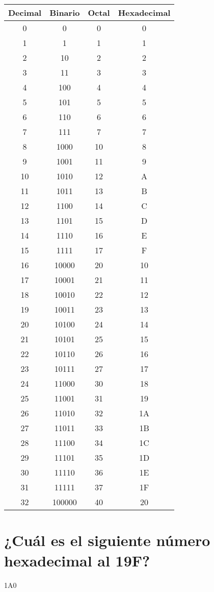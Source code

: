\documentclass{article}
\begin{document}
\section{}
\begin{center}
    \begin{tabular}{ |c|c|c|c| }
        \hline
        Decimal & Binario & Octal & Hexadecimal \\
        \hline
        0 & 0 & 0 & 0 \\
        1 & 1 & 1 & 1 \\
        2 & 10 & 2 & 2 \\
        3 & 11 & 3 & 3 \\
        4 & 100 & 4 & 4 \\
        5 & 101 & 5 & 5 \\
        6 & 110 & 6 & 6 \\
        7 & 111 & 7 & 7 \\
        8 & 1000 & 10 & 8 \\
        9 & 1001 & 11 & 9 \\
        10 & 1010 & 12 & A \\
        11 & 1011 & 13 & B \\
        12 & 1100 & 14 & C \\
        13 & 1101 & 15 & D \\
        14 & 1110 & 16 & E \\
        15 & 1111 & 17 & F \\
        16 & 10000 & 20 & 10 \\
        17 & 10001 & 21 & 11 \\
        18 & 10010 & 22 & 12 \\
        19 & 10011 & 23 & 13 \\
        20 & 10100 & 24 & 14 \\
        21 & 10101 & 25 & 15 \\
        22 & 10110 & 26 & 16 \\
        23 & 10111 & 27 & 17 \\
        24 & 11000 & 30 & 18 \\
        25 & 11001 & 31 & 19 \\
        26 & 11010 & 32 & 1A \\
        27 & 11011 & 33 & 1B \\
        28 & 11100 & 34 & 1C \\
        29 & 11101 & 35 & 1D \\
        30 & 11110 & 36 & 1E \\
        31 & 11111 & 37 & 1F \\
        32 & 100000 & 40 & 20 \\
        \hline
    \end{tabular}
\end{center}
\section{¿Cuál es el siguiente número hexadecimal al 19F?}
1A0
\end{document}
